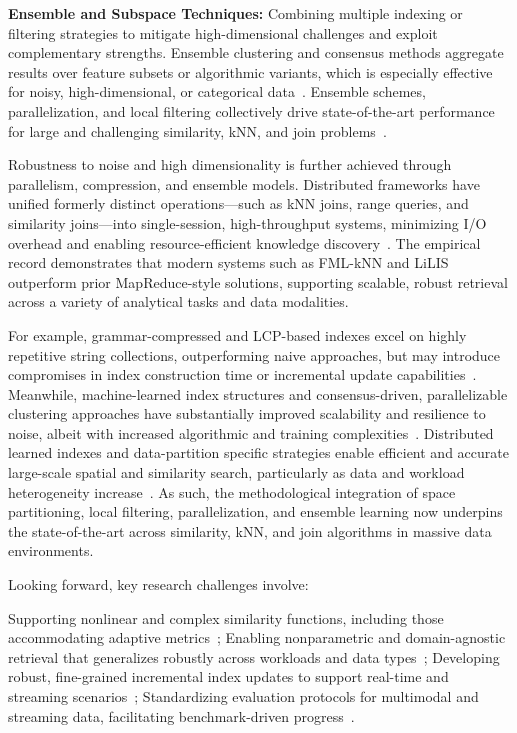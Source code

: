 \documentclass[sigconf]{acmart}
\begin{document}
\textbf{Ensemble and Subspace Techniques:} Combining multiple indexing or filtering strategies to mitigate high-dimensional challenges and exploit complementary strengths. Ensemble clustering and consensus methods aggregate results over feature subsets or algorithmic variants, which is especially effective for noisy, high-dimensional, or categorical data~\cite{ref73,ref75,ref116,ref98}. Ensemble schemes, parallelization, and local filtering collectively drive state-of-the-art performance for large and challenging similarity, kNN, and join problems~\cite{ref30,ref31,ref34,ref35,ref39,ref45,ref47,ref50,ref51,ref54,ref56,ref73,ref75,ref86,ref91,ref98,ref107,ref111,ref114,ref118}.

Robustness to noise and high dimensionality is further achieved through parallelism, compression, and ensemble models. Distributed frameworks have unified formerly distinct operations—such as kNN joins, range queries, and similarity joins—into single-session, high-throughput systems, minimizing I/O overhead and enabling resource-efficient knowledge discovery~\cite{ref75,ref116,ref118,ref111}. The empirical record demonstrates that modern systems such as FML-kNN and LiLIS outperform prior MapReduce-style solutions, supporting scalable, robust retrieval across a variety of analytical tasks and data modalities.

For example, grammar-compressed and LCP-based indexes excel on highly repetitive string collections, outperforming naive approaches, but may introduce compromises in index construction time or incremental update capabilities~\cite{ref73,ref91,ref98,ref30}. Meanwhile, machine-learned index structures and consensus-driven, parallelizable clustering approaches have substantially improved scalability and resilience to noise, albeit with increased algorithmic and training complexities~\cite{ref111,ref116}. Distributed learned indexes and data-partition specific strategies enable efficient and accurate large-scale spatial and similarity search, particularly as data and workload heterogeneity increase~\cite{ref54,ref111,ref114}. As such, the methodological integration of space partitioning, local filtering, parallelization, and ensemble learning now underpins the state-of-the-art across similarity, kNN, and join algorithms in massive data environments.

Looking forward, key research challenges involve:

Supporting nonlinear and complex similarity functions, including those accommodating adaptive metrics~\cite{ref39};
Enabling nonparametric and domain-agnostic retrieval that generalizes robustly across workloads and data types~\cite{ref34,ref116,ref98};
Developing robust, fine-grained incremental index updates to support real-time and streaming scenarios~\cite{ref31,ref47,ref56};
Standardizing evaluation protocols for multimodal and streaming data, facilitating benchmark-driven progress~\cite{ref73,ref86}.
\end{document}
